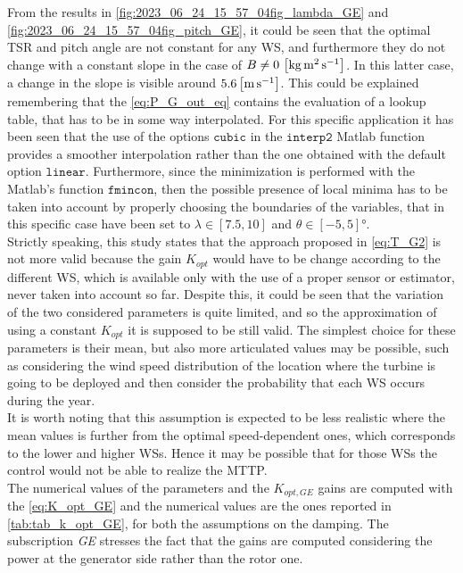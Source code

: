 From the results in \autoref{fig:2023_06_24_15_57_04fig_lambda_GE} and \ref{fig:2023_06_24_15_57_04fig_pitch_GE}, it could be seen that the optimal TSR and pitch angle are not constant for any WS, and furthermore they do not change with a constant slope in the case of $B\neq0 \, \left[\si{\kilo\gram\square\meter\per\second}\right]$. In this latter case, a change in the slope is visible around $5.6 \left[\si{\meter \per\second}\right]$. This could be explained remembering that the \autoref{eq:P_G_out_eq} contains the evaluation of a lookup table, that has to be in some way interpolated. For this specific application it has been seen that the use of the options $\texttt{cubic}$ in the $\texttt{interp2}$ Matlab function provides a smoother interpolation rather than the one obtained with the default option $\texttt{linear}$. Furthermore, since the minimization is performed with the Matlab's function $\texttt{fmincon}$, then the possible presence of local minima has to be taken into account by properly choosing the boundaries of the variables, that in this specific case have been set to $\lambda \in \left[7.5, 10\right]$ and $\theta\in\left[-5, 5\right] \si{\degree}$.  \\
Strictly speaking, this study states that the approach proposed in \autoref{eq:T_G2} is not more valid because the gain $K_{opt}$ would have to be change according to the different WS, which is available only with the use of a proper sensor or estimator, never taken into account so far. Despite this, it could be seen that the variation of the two considered parameters is quite limited, and so the approximation of using a constant $K_{opt}$ it is supposed to be still valid. The simplest choice for these parameters is their mean, but also more articulated values may be possible, such as considering the wind speed distribution of the location where the turbine is going to be deployed and then consider the probability that each WS occurs during the year.\\
It is worth noting that this assumption is expected to be less realistic where the mean values is further from the optimal speed-dependent ones, which corresponds to the lower and higher WSs. Hence it may be possible that for those WSs the control would not be able to realize the MTTP.\\ 
The numerical values of the parameters and the $K_{opt,GE}$ gains are computed with the \autoref{eq:K_opt_GE} and the numerical values are the ones reported in \autoref{tab:tab_k_opt_GE}, for both the assumptions on the damping. The subscription \textit{GE} stresses the fact that the gains are computed considering the power at the generator side rather than the rotor one.

